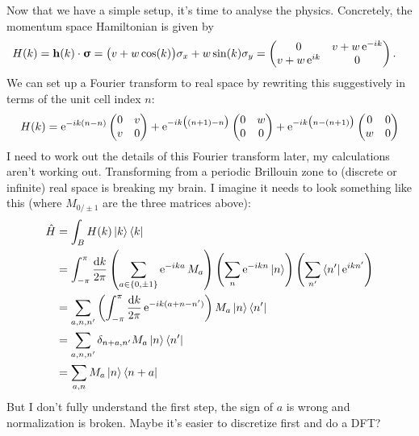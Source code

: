 Now that we have a simple setup, it's time to analyse the physics. Concretely, the momentum space Hamiltonian is given by
\begin{align*}
	H(k) &= \vb{h}(k)\cdot\bm{\upsigma} = \big(v + w\cos(k)\big)\sigma_x + w\sin(k)\sigma_y = \begin{pmatrix}
		0 & v + w\operatorname{e}^{-ik} \\
		v + w\operatorname{e}^{ik} & 0
	\end{pmatrix}.
\end{align*}
We can set up a Fourier transform to real space by rewriting this suggestively in terms of the unit cell index $n$:
\[
	H(k) = \operatorname{e}^{-ik(n-n)}\begin{pmatrix}
		0 & v \\
		v & 0
	\end{pmatrix} + \operatorname{e}^{-ik\big((n+1)-n\big)}\begin{pmatrix}
		0 & w \\
		0 & 0
	\end{pmatrix} + \operatorname{e}^{-ik\big(n-(n+1)\big)}\begin{pmatrix}
		0 & 0 \\
		w & 0
	\end{pmatrix}
\]
{\color{red} I need to work out the details of this Fourier transform later, my calculations aren't working out. Transforming from a periodic Brillouin zone to (discrete or infinite) real space is breaking my brain. I imagine it needs to look something like this (where $M_{0/\pm1}$ are the three matrices above):
\begin{align*}
	\hat{H} &= \int_B H(k) \ket{k}\bra{k} \\
		&= \int_{-\pi}^{\pi}\frac{\dd{k}}{2\pi} \left(\sum_{a\in\{0,\pm1\}}\operatorname{e}^{-ika}M_a\right) \left(\sum_{n}\operatorname{e}^{-ikn}\ket{n}\right) \left(\sum_{n'}\bra{n'}\operatorname{e}^{ikn'}\right) \\
		&= \sum_{a,n,n'}\left(\int_{-\pi}^{\pi}\frac{\dd{k}}{2\pi}\operatorname{e}^{-ik(a+n-n')}\right)M_a\ket{n}\bra{n'} \\
		&= \sum_{a,n,n'}\delta_{n+a,n'}M_a\ket{n}\bra{n'} \\
		&= \sum_{a,n}M_a\ket{n}\bra{n+a}
\end{align*}
But I don't fully understand the first step, the sign of $a$ is wrong and normalization is broken. Maybe it's easier to discretize first and do a DFT?}

